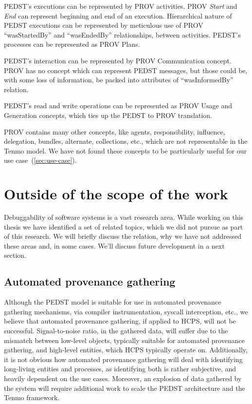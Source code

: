 PEDST’s executions can be represented by PROV activities. PROV \textit{Start} and \textit{End} can represent beginning and end of an execution. Hierarchical nature of PEDST executions can be represented by meticulous use of PROV ``wasStartedBy''  and ``wasEndedBy''  relationships, between activities. PEDST’s processes can be represented as PROV Plans.

PEDST’s interaction can be represented by PROV Communication concept. PROV has no concept which can represent PEDST messages, but those could be, with some loss of information, be packed into attributes of ``wasInformedBy'' relation.

PEDST’s read and write operations can be represented as PROV Usage and Generation concepts, which ties up the PEDST to PROV translation.

PROV contains many other concepts, like agents, responsibility, influence, delegation, bundles, alternate, collections, etc., which are not representable in the Tenmo model. We have not found these concepts to be particularly useful for our use case~(\cref{sec:use-case}).





\begin{comment}
BRAK CZASU

\todo{IMAGE: Translation of an example from Tenmo to PROV}
\todo{TABLE: Maybe add translation table}
\end{comment}


\section{Outside of the scope of the work}

Debuggability of software systems is a vast research area. While working on this thesis we have identified a set of related topics, which we did not pursue as part of this research. We will briefly discuss the relation, why we have not addressed these areas and, in some cases. We'll discuss future development in a next section.

\subsection{Automated provenance gathering}

Although the PEDST model is suitable for use in automated provenance gathering mechanisms, via compiler instrumentation, syscall interception, etc., we believe that automated provenance gathering, if applied to HCPS, will not be successful. Signal-to-noise ratio, in the gathered data, will suffer due to the mismatch between low-level objects, typically suitable for automated provenance gathering, and high-level entities, which HCPS typically operate on. Additionally, it is not obvious how automated provenance gathering will deal with identifying long-living entities and processes, as identifying both is rather subjective, and heavily dependent on the use cases. Moreover, an explosion of data gathered by the system will require additional work to scale the PEDST architecture and the Tenmo framework. 

